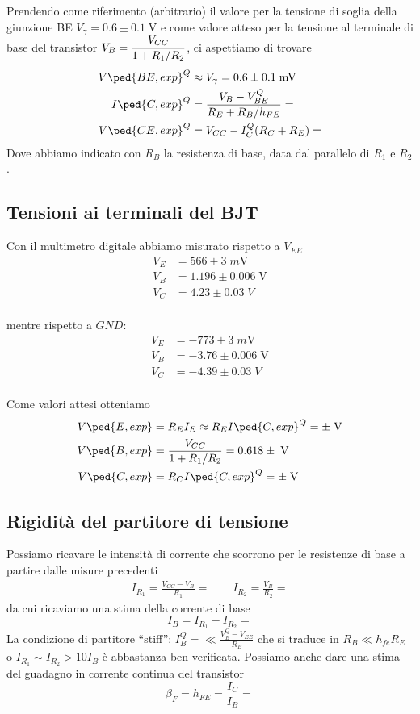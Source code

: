 \documentclass[10pt,a4paper]{article}
\begin{document}
Prendendo come riferimento (arbitrario) il valore per la tensione di soglia
della giunzione BE $V_\gamma = 0.6 \pm 0.1 \; \si{\V}$ e come valore atteso
per la tensione al terminale di base del transistor
$\displaystyle V_B = \frac{V_{CC}}{1 + R_1/R_2}$, ci aspettiamo di trovare
\begin{align*}
V\ped{BE, exp}^Q&\approx V_\gamma = 0.6 \pm 0.1 \; \si{m\V} \\
I\ped{C, exp}^Q &= \frac{V_B - V_{BE}^Q}{R_E + R_B/h_{FE}} = \\
V\ped{CE, exp}^Q &= V_{CC} - I_C^Q(R_C + R_E) =
\end{align*}
Dove abbiamo indicato con $R_B$ la resistenza di base, data dal parallelo di
$R_1$ e $R_2$.

\subsection{Tensioni ai terminali del BJT}
Con il multimetro digitale abbiamo misurato rispetto a $V_{EE}$
\begin{align*}
V_E &= 566 \pm 3 \; \si{m\V} \\
V_B &= 1.196 \pm 0.006 \; \si{\V} \\
V_C &= 4.23 \pm 0.03 \; \si{V} \\
\end{align*}

mentre rispetto a $GND$:
\begin{align*}
V_E &= -773 \pm 3 \; \si{m\V} \\
V_B &= -3.76 \pm 0.006 \; \si{\V} \\
V_C &= -4.39 \pm 0.03 \; \si{V} \\
\end{align*}

Come valori attesi otteniamo
\begin{align*}
V\ped{E, exp} &= R_E I_E \approx R_E I\ped{C, exp}^Q = \pm \; \si{V} \\
V\ped{B, exp} &= \frac{V_{CC}}{1 + R_1/R_2} = 0.618 \pm  \; \si{\V} \\
V\ped{C, exp} &= R_C I\ped{C, exp}^Q = \pm  \; \si{V} \\
\end{align*}
\subsection{Rigidità del partitore di tensione}
Possiamo ricavare le intensità di corrente che scorrono per le resistenze
di base a partire dalle misure precedenti
\begin{align*}
I_{R_1} = \frac{V_{CC} - V_B}{R_1} = \qquad I_{R_2} = \frac{V_B}{R_2} = 
\end{align*}
da cui ricaviamo una stima della corrente di base
\[
I_B = I_{R_1} - I_{R_2} = 
\]
La condizione di partitore ``stiff'': $I_B^Q = \ll \frac{V_B^Q - V_{EE}}{R_B}$
che si traduce in $R_B \ll h_{fe} R_E$ o $I_{R_1} \sim I_{R_2} > 10 I_{B}$ è
abbastanza ben verificata.
Possiamo anche dare una stima del guadagno in corrente continua del transistor
\[
\beta_F = h_{FE} = \frac{I_C}{I_B} = 
\]
\end{document}
